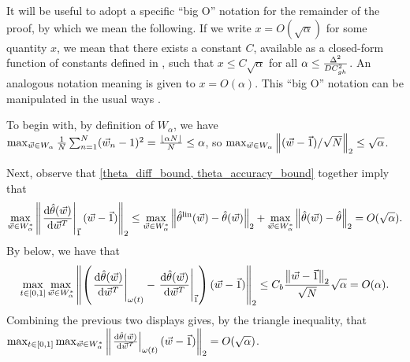 It will be useful to adopt a specific ``big O'' notation for the remainder of the
proof, by which we mean the following.  If we write $x = O(\sqrt{\alpha})$ for
some quantity $x$, we mean that there exists a constant $C$, available as a
closed-form function of constants defined in ,
such that $x \le C \sqrt{\alpha}$ for all $\alpha \le \frac{\Delta^2}{DC_{gh}^2}$.
An analogous notation meaning is given to $x = O(\alpha)$.  This ``big O''
notation can be manipulated in the usual ways \citep{bruijn:1981:asymptotic}.

To begin with, by definition of $W_\alpha$, we have $\max_{\vec{w} \in W_\alpha}
\frac{1}{N}\sum_{n=1}^N (\vec{w}_n - 1)^2 = \frac{\lfloor \alpha N \rfloor}{N} \le \alpha$, so
$\max_{\vec{w} \in W_\alpha} \left\Vert (\vec{w} - \vec{1}) / \sqrt{N}\right\Vert_2 \le \sqrt{\alpha}$.

Next, observe that \eqref{theta_diff_bound, theta_accuracy_bound} together imply
that
%
\begin{align*}
%
\max_{\w \in W_\alpha^*}\vnorm{\fracat{\dee\thetahat(\w)}{\dee\w^T}{\onevec}(\w -
\onevec)}_2
\le \max_{\w \in W_\alpha^*} \vnorm{\thetalin(\w) - \thetahat(\w)}_2 +
\max_{\w \in W_\alpha^*} \vnorm{\thetahat(\w) - \thetahat}_2
= O(\sqrt{\alpha}).
%
\end{align*}
%
By  below, we have that
%
\begin{align*}
%
\max_{t \in [0,1]}
\max_{\w \in W_\alpha^*}
\vnorm{\left(
    \fracat{\dee \thetahat(\w)}{ \dee \w^T}{\omega(t)} -
    \fracat{\dee \thetahat(\w)}{ \dee \w^T}{\onevec}
    \right) (\w - \onevec) }_2
\le C_b \frac{\vnorm{\w - \onevec}_2}{\sqrt{N}} \sqrt{\alpha}
= O(\alpha).
%
\end{align*}
%
Combining the previous two displays gives, by the triangle inequality, that
$\max_{t \in [0,1]} \max_{\vec{w} \in W_\alpha^*} \left\Vert \left.\frac{\mathrm{d} \hat{\theta}(\vec{w})}{
\mathrm{d}\vec{w}^T}\right|_{\omega(t)}(\vec{w} - \vec{1})\right\Vert_2 = O(\sqrt{\alpha})$.


